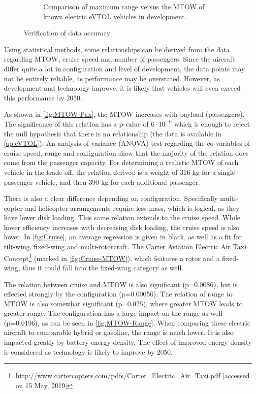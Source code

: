 \begin{figure}[H]
\begin{subfigure}[t]{0.5\textwidth}
    \captionsetup{width=.8\linewidth}
    \caption{Comparison of maximum range versus the MTOW of known electric eVTOL vehicles in development.}
    \label{fig:MTOW-Range}
\end{subfigure}
\captionsetup{justification=centering}
\caption{Verification of data accuracy}
\label{fig:MTOW-stats}
\end{figure}

Using statistical methods, some relationships can be derived from the data regarding MTOW, cruise speed and number of passengers. Since the aircraft differ quite a lot in configuration and level of development, the data points may not be entirely reliable, as performance may be overstated. However, as development and technology improve, it is likely that vehicles will even exceed this performance by 2050.

As shown in \autoref{fig:MTOW-Pax}, the MTOW increases with payload (passengers). The significance of this relation has a p-value of $6\cdot10^{-6}$ which is enough to reject the null hypothesis that there is no relationship (the data is available in \autoref{ap:eVTOL}). An analysis of variance (ANOVA) test regarding the co-variables of cruise speed, range and configuration show that the majority of the relation does come from the passenger capacity. For determining a realistic MTOW of each vehicle in the trade-off, the relation derived is a weight of 316 kg for a single passenger vehicle, and then 390 kg for each additional passenger.

There is also a clear difference depending on configuration. Specifically multi-copter and helicopter  arrangements require less mass, which is logical, as they have lower disk loading. This same relation extends to the cruise speed. While hover efficiency increases with decreasing disk loading, the cruise speed is also lower. In \autoref{fig:Cruise}, an average regression is given in black, as well as a fit for tilt-wing, fixed-wing and multi-rotorcraft. %
The Carter Aviation Electric Air Taxi Concept\footnote{\url{http://www.cartercopters.com/pdfs/Carter_Electric_Air_Taxi.pdf} [accessed on 15 May, 2019]} (marked in \autoref{fig:Cruise-MTOW}), which features a rotor and a fixed-wing, thus it could fall into the fixed-wing category as well.

The relation between cruise and MTOW is also significant (p=0.0086), but is effected strongly by the configuration (p=0.00056). The relation of range to MTOW is also somewhat significant (p=0.025), where greater MTOW leads to greater range. The configuration has a large impact on the range as well (p=0.0196), as can be seen in \autoref{fig:MTOW-Range}. When comparing these electric aircraft to comparable hybrid or gasoline, the range is much lower. It is also impacted greatly by battery energy density. The effect of improved energy density is considered as technology is likely to improve by 2050.

